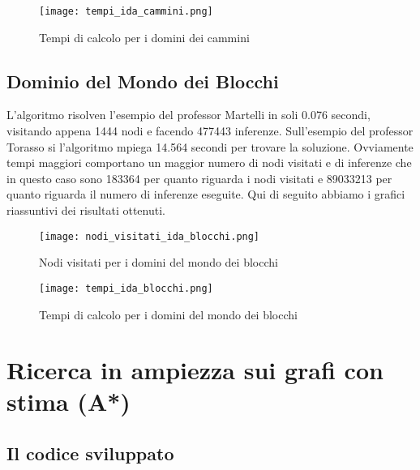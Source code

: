 \begin{figure}[htp]
  \texttt{[image: tempi\_ida\_cammini.png]}
  \caption{Tempi di calcolo per i domini dei cammini}
  \label{fig:figure10}
\end{figure}

\subsection{Dominio del Mondo dei Blocchi}

 L'algoritmo risolven l'esempio del professor Martelli in soli 0.076 secondi, visitando appena 1444 nodi e facendo 477443 inferenze. Sull'esempio del professor Torasso si l'algoritmo mpiega 14.564 secondi per trovare la soluzione. Ovviamente tempi maggiori comportano un maggior numero di nodi visitati e di inferenze che in questo caso sono 183364 per quanto riguarda i nodi visitati e 89033213 per quanto riguarda il numero di inferenze eseguite.
Qui di seguito abbiamo i grafici riassuntivi dei risultati ottenuti.

\begin{figure}[htp]
  \texttt{[image: nodi\_visitati\_ida\_blocchi.png]}
  \caption{Nodi visitati per i domini del mondo dei blocchi}
  \label{fig:figure11}
\end{figure}

\begin{figure}[htp]
  \texttt{[image: tempi\_ida\_blocchi.png]}
  \caption{Tempi di calcolo per i domini del mondo dei blocchi}
  \label{fig:figure12}
\end{figure}

\newpage
\section{Ricerca in ampiezza sui grafi con stima (A*)}

\subsection{Il codice sviluppato}

